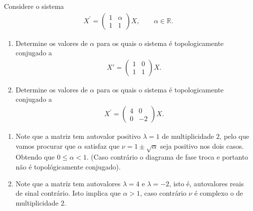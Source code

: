 \begin{homeworkProblem}[4]
  Considere o sistema
  \begin{align*}
    X^{\prime} = \begin{pmatrix}
      1 & \alpha\\
      1 & 1
      \end{pmatrix}X,\qquad \alpha\in\mathbb{R}.
  \end{align*}
  \begin{enumerate}
    \item Determine os valores de $\alpha$ para os quais o sistema é
    topologicamente conjugado a
    \begin{align*}
      X' = \begin{pmatrix}
        1 & 0\\
        1 & 1
      \end{pmatrix}X.
    \end{align*}
    \item Determine os valores de $\alpha$ para os quais o sistema é
    topologicamente conjugado a
    \begin{align*}
      X^{\prime} = \begin{pmatrix}
        4 & 0\\
        0 & -2
      \end{pmatrix}X.
    \end{align*}
  \end{enumerate}
  \begin{solution}
  \begin{enumerate}
    \item Note que a matriz tem autovalor positivo $\lambda=1$ de multiplicidade $2$, pelo que vamos procurar que $\alpha$ satisfaz que $\nu=1\pm\sqrt{\alpha}$ seja positivo nos dois casos. Obtendo que $0\leq \alpha<1$. (Caso contrário o diagrama de fase troca e portanto não é topológicamente conjugado).
    \item Note que a matríz tem autovalores $\lambda=4$ e $\lambda=-2$, isto é, autovalores reais de sinal contrário. Isto implica que $\alpha>1$, caso contrário $\nu$ é complexo o de multiplicidade $2$. 
  \end{enumerate} 
  \end{solution}
\end{homeworkProblem}
